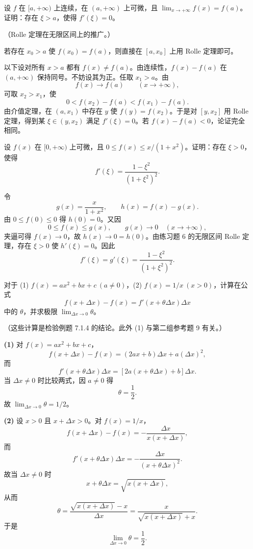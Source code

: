 \begin{xexercise}[6]
设 $f$ 在 $[a,+\infty)$ 上连续，在 $(a,+\infty)$ 上可微，且 $\lim_{x\to+\infty}f(x)=f(a)$。证明：存在 $\xi>a$，使得 $f'(\xi)=0$。

（Rolle 定理在无限区间上的推广。）
\end{xexercise}
\begin{xsolution}
若存在 $x_0>a$ 使 $f(x_0)=f(a)$，则直接在 $[a,x_0]$ 上用 Rolle 定理即可。

以下设对所有 $x>a$ 都有 $f(x)\neq f(a)$。由连续性，$f(x)-f(a)$ 在 $(a,+\infty)$ 保持同号。不妨设其为正。任取 $x_1>a$。由
\[
  f(x)\to f(a)\qquad(x\to+\infty),
\]
可取 $x_2>x_1$，使
\[
  0<f(x_2)-f(a)<f(x_1)-f(a).
\]
由介值定理，在 $(a,x_1)$ 中存在 $y$ 使 $f(y)=f(x_2)$。于是对 $[y,x_2]$ 用 Rolle 定理，得到某 $\xi\in(y,x_2)$ 满足 $f'(\xi)=0$。若 $f(x)-f(a)<0$，论证完全相同。
\end{xsolution}


\begin{xexercise}[7]
设 $f(x)$ 在 $[0,+\infty)$ 上可微，且 $0\leqslant f(x)\leqslant x/(1+x^2)$。证明：存在 $\xi>0$，使得
\[
  f'(\xi)=\frac{1-\xi^2}{(1+\xi^2)^2}.
\]
\end{xexercise}
\begin{xsolution}
令
\[
  g(x)=\frac{x}{1+x^2},
  \qquad
  h(x)=f(x)-g(x).
\]
由 $0\leqslant f(0)\leqslant0$ 得 $h(0)=0$。又因
\[
  0\leqslant f(x)\leqslant g(x),
  \qquad
  g(x)\to0\quad(x\to+\infty),
\]
夹逼可得 $f(x)\to0$，故 $h(x)\to0=h(0)$。由练习题 6 的无限区间 Rolle 定理，存在 $\xi>0$ 使 $h'(\xi)=0$。因此
\[
  f'(\xi)=g'(\xi)=\frac{1-\xi^2}{(1+\xi^2)^2}.
\]
\end{xsolution}


\begin{xexercise}[8]
对于 (1) $f(x)=ax^2+bx+c\ (a\neq0)$，(2) $f(x)=1/x\ (x>0)$，计算在公式
\[
  f(x+\Delta x)-f(x)=f'(x+\theta\Delta x)\Delta x
\]
中的 $\theta$，并求极限 $\lim_{\Delta x\to0}\theta$。

（这些计算是检验例题 7.1.4 的结论。此外 (1) 与第二组参考题 9 有关。）
\end{xexercise}
\begin{xsolution}
\textbf{(1)}\quad
对 $f(x)=ax^2+bx+c$，
\[
  f(x+\Delta x)-f(x)
  =(2ax+b)\Delta x+a(\Delta x)^2,
\]
而
\[
  f'(x+\theta\Delta x)\Delta x
  =[2a(x+\theta\Delta x)+b]\Delta x.
\]
当 $\Delta x\neq0$ 时比较两式，因 $a\neq0$ 得
\[
  \theta=\frac12.
\]
故 $\lim_{\Delta x\to0}\theta=1/2$。

\textbf{(2)}\quad
设 $x>0$ 且 $x+\Delta x>0$。对 $f(x)=1/x$，
\[
  f(x+\Delta x)-f(x)
  =-\frac{\Delta x}{x(x+\Delta x)},
\]
而
\[
  f'(x+\theta\Delta x)\Delta x
  =-\frac{\Delta x}{(x+\theta\Delta x)^2}.
\]
故当 $\Delta x\neq0$ 时
\[
  x+\theta\Delta x=\sqrt{x(x+\Delta x)},
\]
从而
\[
  \theta
  =\frac{\sqrt{x(x+\Delta x)}-x}{\Delta x}
  =\frac{x}{\sqrt{x(x+\Delta x)}+x}.
\]
于是
\[
  \lim_{\Delta x\to0}\theta=\frac12.
\]
\end{xsolution}



